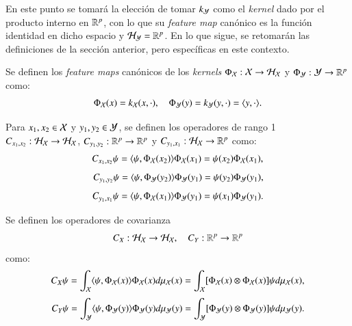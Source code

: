 En este punto se tomará la elección de tomar $k_{\mathcal{Y}}$ como el \textit{kernel} dado por el producto interno en $\mathbb{R}^p$, con lo que su \textit{feature map} canónico es la función identidad en dicho espacio y $\mathcal{H}_{\mathcal{Y}} = \mathbb{R}^p$. En lo que sigue, se retomarán las definiciones de la sección anterior, pero específicas en este contexto.

\begin{defn}
	Se definen los \textit{feature maps} canónicos de los \textit{kernels} $\Phi_{\mathcal{X}} : \mathcal{X} \to \mathcal{H}_{\mathcal{X}}$ y $\Phi_{\mathcal{Y}} : \mathcal{Y} \to \mathbb{R}^p$ como:
	\begin{equation*}
		\Phi_{\mathcal{X}} (x) = k_{\mathcal{X}} (x, \cdot), \quad \Phi_{\mathcal{Y}} (y) = k_{\mathcal{Y}} (y, \cdot) = \langle y, \cdot \rangle.
	\end{equation*}
\end{defn}

\begin{defn}
	Para $x_1, x_2 \in \mathcal{X}$ y $y_1, y_2 \in \mathcal{Y}$, se definen los operadores de rango 1 $C_{x_1,x_2} : \mathcal{H}_{\mathcal{X}} \to \mathcal{H}_{\mathcal{X}}$, $C_{y_1,y_2} : \mathbb{R}^p \to \mathbb{R}^p$ y $C_{y_1,x_1} : \mathcal{H}_{\mathcal{X}} \to \mathbb{R}^p$ como:
	\begin{equation*}
		C_{x_1, x_2} \psi = \langle \psi, \Phi_{\mathcal{X}} (x_2) \rangle \Phi_{\mathcal{X}} (x_1) = \psi (x_2) \Phi_{\mathcal{X}} (x_1),
	\end{equation*}
	\begin{equation*}
		C_{y_1, y_2} \psi = \langle \psi, \Phi_{\mathcal{Y}} (y_2) \rangle \Phi_{\mathcal{Y}} (y_1) = \psi (y_2) \Phi_{\mathcal{Y}} (y_1),
	\end{equation*}
	\begin{equation*}
		C_{y_1, x_1} \psi = \langle \psi, \Phi_{\mathcal{X}} (x_1) \rangle \Phi_{\mathcal{Y}} (y_1) = \psi (x_1) \Phi_{\mathcal{Y}} (y_1).
	\end{equation*}
\end{defn}

\begin{defn}
	Se definen los operadores de covarianza 
    \begin{equation*}
        C_X : \mathcal{H}_{\mathcal{X}} \to \mathcal{H}_{\mathcal{X}}, \quad C_Y : \mathbb{R}^p \to \mathbb{R}^p
    \end{equation*} 
    como:
	\begin{equation*}
		C_X \psi = \int_{\mathcal{X}} \langle \psi, \Phi_{\mathcal{X}} (x) \rangle \Phi_{\mathcal{X}} (x) d \mu_{\mathcal{X}} (x) = \int_{\mathcal{X}} [\Phi_{\mathcal{X}} (x) \otimes \Phi_{\mathcal{X}} (x)] \psi d \mu_{\mathcal{X}} (x),
	\end{equation*}
	\begin{equation*}
		C_Y \psi = \int_{\mathcal{Y}} \langle \psi, \Phi_{\mathcal{Y}} (y) \rangle \Phi_{\mathcal{Y}} (y) d \mu_{\mathcal{Y}} (y) = \int_{\mathcal{Y}} [\Phi_{\mathcal{Y}} (y) \otimes \Phi_{\mathcal{Y}} (y)] \psi d \mu_{\mathcal{Y}} (y).
	\end{equation*}
\end{defn}

